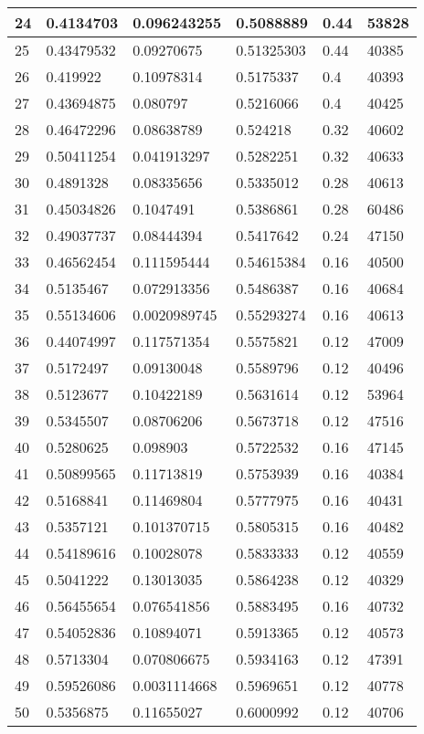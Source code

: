\begin{longtable}{|l|l|l|l|l|l|}
24 & 0.4134703 & 0.096243255 & 0.5088889 & 0.44 & 53828 \\ \hline 
25 & 0.43479532 & 0.09270675 & 0.51325303 & 0.44 & 40385 \\ \hline 
26 & 0.419922 & 0.10978314 & 0.5175337 & 0.4 & 40393 \\ \hline 
27 & 0.43694875 & 0.080797 & 0.5216066 & 0.4 & 40425 \\ \hline 
28 & 0.46472296 & 0.08638789 & 0.524218 & 0.32 & 40602 \\ \hline 
29 & 0.50411254 & 0.041913297 & 0.5282251 & 0.32 & 40633 \\ \hline 
30 & 0.4891328 & 0.08335656 & 0.5335012 & 0.28 & 40613 \\ \hline 
31 & 0.45034826 & 0.1047491 & 0.5386861 & 0.28 & 60486 \\ \hline 
32 & 0.49037737 & 0.08444394 & 0.5417642 & 0.24 & 47150 \\ \hline 
33 & 0.46562454 & 0.111595444 & 0.54615384 & 0.16 & 40500 \\ \hline 
34 & 0.5135467 & 0.072913356 & 0.5486387 & 0.16 & 40684 \\ \hline 
35 & 0.55134606 & 0.0020989745 & 0.55293274 & 0.16 & 40613 \\ \hline 
36 & 0.44074997 & 0.117571354 & 0.5575821 & 0.12 & 47009 \\ \hline 
37 & 0.5172497 & 0.09130048 & 0.5589796 & 0.12 & 40496 \\ \hline 
38 & 0.5123677 & 0.10422189 & 0.5631614 & 0.12 & 53964 \\ \hline 
39 & 0.5345507 & 0.08706206 & 0.5673718 & 0.12 & 47516 \\ \hline 
40 & 0.5280625 & 0.098903 & 0.5722532 & 0.16 & 47145 \\ \hline 
41 & 0.50899565 & 0.11713819 & 0.5753939 & 0.16 & 40384 \\ \hline 
42 & 0.5168841 & 0.11469804 & 0.5777975 & 0.16 & 40431 \\ \hline 
43 & 0.5357121 & 0.101370715 & 0.5805315 & 0.16 & 40482 \\ \hline 
44 & 0.54189616 & 0.10028078 & 0.5833333 & 0.12 & 40559 \\ \hline 
45 & 0.5041222 & 0.13013035 & 0.5864238 & 0.12 & 40329 \\ \hline 
46 & 0.56455654 & 0.076541856 & 0.5883495 & 0.16 & 40732 \\ \hline 
47 & 0.54052836 & 0.10894071 & 0.5913365 & 0.12 & 40573 \\ \hline 
48 & 0.5713304 & 0.070806675 & 0.5934163 & 0.12 & 47391 \\ \hline 
49 & 0.59526086 & 0.0031114668 & 0.5969651 & 0.12 & 40778 \\ \hline 
50 & 0.5356875 & 0.11655027 & 0.6000992 & 0.12 & 40706 \\ \hline 
\end{longtable}